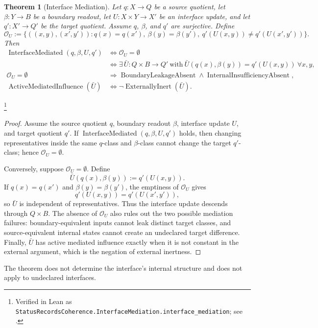 \documentclass[11pt]{article}
\newtheorem{theorem}{Theorem}[section]
\theoremstyle{definition}
\begin{document}
\begin{theorem}[Interface Mediation]\label{thm:F22}
Let \(q:X\to Q\) be a source quotient, let
\(\beta:Y\to B\) be a boundary readout, let
\(U:X\times Y\to X'\) be an interface update, and let
\(q':X'\to Q'\) be the target quotient.  Assume \(q\), \(\beta\),
and \(q'\) are surjective.  Define
\[
  \mathcal O_U
  :=
  \{((x,y),(x',y')) :
    q(x)=q(x'),\ \beta(y)=\beta(y'),\
    q'(U(x,y))\ne q'(U(x',y'))\}.
\]
Then
\begin{align*}
  \operatorname{InterfaceMediated}(q,\beta,U,q')
  &\iff \mathcal O_U=\emptyset\\
  &\iff
  \exists\,\bar U:Q\times B\to Q'\ \text{with}\
    \bar U(q(x),\beta(y))=q'(U(x,y))\ \forall x,y,\\
  \mathcal O_U=\emptyset
  &\Longrightarrow
  \operatorname{BoundaryLeakageAbsent}\wedge
  \operatorname{InternalInsufficiencyAbsent},\\
  \operatorname{ActiveMediatedInfluence}(\bar U)
  &\iff \neg\operatorname{ExternallyInert}(\bar U).
\end{align*}
\end{theorem}
\footnote{\raggedright Verified in Lean as
\texttt{StatusRecordsCoherence.InterfaceMediation.\allowbreak{}interface\_mediation};
see \Cref{app:formalization}.}
\begin{proof}
Assume the source quotient \(q\), boundary readout \(\beta\),
interface update \(U\), and target quotient \(q'\).  If
\(\operatorname{InterfaceMediated}(q,\beta,U,q')\) holds, then
changing representatives inside the same \(q\)-class and
\(\beta\)-class cannot change the target \(q'\)-class; hence
\(\mathcal O_U=\emptyset\).

Conversely, suppose \(\mathcal O_U=\emptyset\).  Define
\[
  \bar U(q(x),\beta(y)):=q'(U(x,y)).
\]
If \(q(x)=q(x')\) and \(\beta(y)=\beta(y')\), the emptiness of
\(\mathcal O_U\) gives
\[
  q'(U(x,y))=q'(U(x',y')),
\]
so \(\bar U\) is independent of representatives.  Thus the
interface update descends through \(Q\times B\).  The absence of
\(\mathcal O_U\) also rules out the two possible mediation failures:
boundary-equivalent inputs cannot leak distinct target classes, and
source-equivalent internal states cannot create an undeclared target
difference.  Finally, \(\bar U\) has active mediated influence
exactly when it is not constant in the external argument, which is
the negation of external inertness.
\end{proof}

The theorem does not determine the interface's internal structure and
does not apply to undeclared interfaces.
\end{document}
